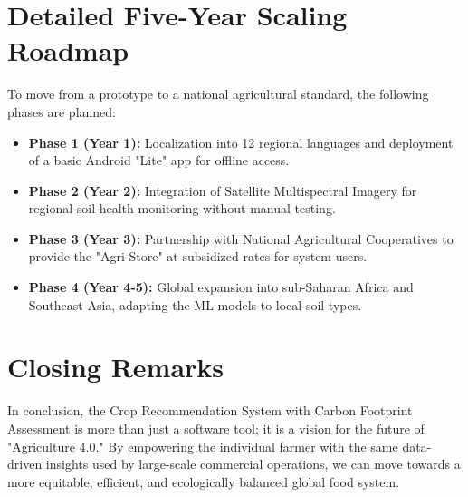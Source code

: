 \documentclass[12pt,a4paper]{report}
\begin{document}
\section{Detailed Five-Year Scaling Roadmap}
To move from a prototype to a national agricultural standard, the following phases are planned:
\begin{itemize}
    \item \textbf{Phase 1 (Year 1):} Localization into 12 regional languages and deployment of a basic Android "Lite" app for offline access.
    \item \textbf{Phase 2 (Year 2):} Integration of Satellite Multispectral Imagery for regional soil health monitoring without manual testing.
    \item \textbf{Phase 3 (Year 3):} Partnership with National Agricultural Cooperatives to provide the "Agri-Store" at subsidized rates for system users.
    \item \textbf{Phase 4 (Year 4-5):} Global expansion into sub-Saharan Africa and Southeast Asia, adapting the ML models to local soil types.
\end{itemize}

\section{Closing Remarks}
In conclusion, the Crop Recommendation System with Carbon Footprint Assessment is more than just a software tool; it is a vision for the future of "Agriculture 4.0." By empowering the individual farmer with the same data-driven insights used by large-scale commercial operations, we can move towards a more equitable, efficient, and ecologically balanced global food system.

\newpage
\end{document}
